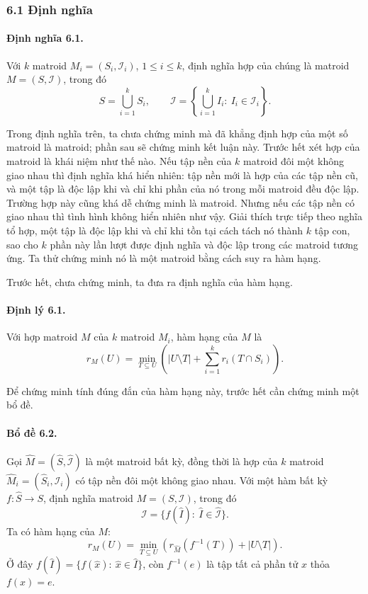 \documentclass[11pt]{article}
\begin{document}
\subsubsection*{6.1 Định nghĩa}

\paragraph{Định nghĩa 6.1.}
Với \(k\) matroid \(M_i=(S_i,\mathcal I_i)\), \(1\le i\le k\), định nghĩa hợp
của chúng là matroid \(M=(S,\mathcal I)\), trong đó
\[
  S=\bigcup_{i=1}^k S_i,\qquad
  \mathcal I=\left\{\bigcup_{i=1}^k I_i:\ I_i\in\mathcal I_i\right\}.
\]

Trong định nghĩa trên, ta chưa chứng minh mà đã khẳng định hợp của một số
matroid là matroid; phần sau sẽ chứng minh kết luận này. Trước hết xét hợp của
matroid là khái niệm như thế nào. Nếu tập nền của \(k\) matroid đôi một không
giao nhau thì định nghĩa khá hiển nhiên: tập nền mới là hợp của các tập nền cũ,
và một tập là độc lập khi và chỉ khi phần của nó trong mỗi matroid đều độc lập.
Trường hợp này cũng khá dễ chứng minh là matroid. Nhưng nếu các tập nền có giao
nhau thì tình hình không hiển nhiên như vậy. Giải thích trực tiếp theo nghĩa tổ
hợp, một tập là độc lập khi và chỉ khi tồn tại cách tách nó thành \(k\) tập con,
sao cho \(k\) phần này lần lượt được định nghĩa và độc lập trong các matroid
tương ứng. Ta thử chứng minh nó là một matroid bằng cách suy ra hàm hạng.

Trước hết, chưa chứng minh, ta đưa ra định nghĩa của hàm hạng.

\paragraph{Định lý 6.1.}
Với hợp matroid \(M\) của \(k\) matroid \(M_i\), hàm hạng của \(M\) là
\[
  r_M(U)=\min_{T\subseteq U}
  \left(|U\setminus T|+\sum_{i=1}^k r_i(T\cap S_i)\right).
\]

Để chứng minh tính đúng đắn của hàm hạng này, trước hết cần chứng minh một bổ
đề.

\paragraph{Bổ đề 6.2.}
Gọi \(\hat M=(\hat S,\hat{\mathcal I})\) là một matroid bất kỳ, đồng thời là hợp
của \(k\) matroid \(\hat M_i=(\hat S_i,\hat{\mathcal I}_i)\) có tập nền đôi một
không giao nhau. Với một hàm bất kỳ \(f:\hat S\to S\), định nghĩa matroid
\(M=(S,\mathcal I)\), trong đó
\[
  \mathcal I=\{f(\hat I):\ \hat I\in\hat{\mathcal I}\}.
\]
Ta có hàm hạng của \(M\):
\[
  r_M(U)=\min_{T\subseteq U}\left(r_{\hat M}(f^{-1}(T))+|U\setminus T|\right).
\]
Ở đây \(f(\hat I)=\{f(\hat x):\ \hat x\in\hat I\}\), còn \(f^{-1}(e)\) là tập
tất cả phần tử \(x\) thỏa \(f(x)=e\).
\end{document}
